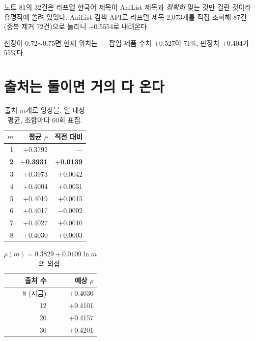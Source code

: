 \documentclass[10pt]{article}
\begin{document}
노트 81의 32건은 라프텔 한국어 제목이 AniList 제목과 \emph{정확히} 맞는 것만
걸린 것이라 유명작에 쏠려 있었다. AniList 검색 API로 라프텔 제목 2,073개를
직접 조회해 87건(중복 제거 72건)으로 늘리니 $+$0.5554로 내려온다.


천장이 0.72$\sim$0.75면 현재 위치는 --- 팝업 제품 수치 $+$0.527이 71\%,
판정치 $+$0.404가 55\%다.

\section{출처는 둘이면 거의 다 온다}

\begin{table}[t]
\centering\tsize
\caption{출처 $m$개로 앙상블. 열 대상 평균, 조합마다 60회 표집.}
\begin{tabular}{rrr}
\toprule
$m$ & 평균 $\rho$ & 직전 대비 \\
\midrule
1 & $+$0.3792 & --- \\
\textbf{2} & \textbf{$+$0.3931} & \textbf{$+$0.0139} \\
3 & $+$0.3973 & $+$0.0042 \\
4 & $+$0.4004 & $+$0.0031 \\
5 & $+$0.4019 & $+$0.0015 \\
6 & $+$0.4017 & $-$0.0002 \\
7 & $+$0.4027 & $+$0.0010 \\
8 & $+$0.4030 & $+$0.0003 \\
\bottomrule
\end{tabular}
\end{table}


\begin{table}[t]
\centering\tsize
\caption{$\rho(m)=0.3829+0.0109\ln m$ 의 외삽.}
\begin{tabular}{rr}
\toprule
출처 수 & 예상 $\rho$ \\
\midrule
8 (지금) & $+$0.4030 \\
12 & $+$0.4101 \\
20 & $+$0.4157 \\
30 & $+$0.4201 \\
\bottomrule
\end{tabular}
\end{table}
\end{document}
